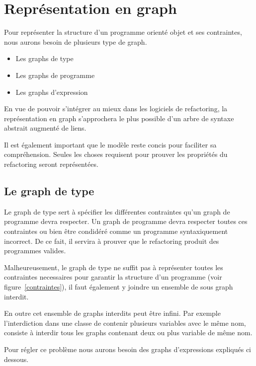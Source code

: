 \documentclass[a4paper, 12pt]{article}
\begin{document}
  \section{Représentation en graph}
  Pour représenter la structure d'un programme orienté objet et ses contraintes, nous aurons besoin de plusieurs type de graph.

  \begin{itemize}[label=\textbullet]
    \item Les graphs de type
    \item Les graphs de programme
    \item Les graphs d'expression
  \end{itemize}

  En vue de pouvoir s'intégrer au mieux dans les logiciels de refactoring, la représentation en graph s'approchera le plus possible d'un arbre de syntaxe abstrait augmenté de liens.

  Il est également important que le modèle reste concis pour faciliter sa compréhension. Seules les choses requisent pour prouver les propriétés du refactoring seront représentées.

  \subsection{Le graph de type}

  Le graph de type sert à spécifier les différentes contraintes qu'un graph de programme devra respecter.
  Un graph de programme devra respecter toutes ces contraintes ou bien être condidéré comme un programme syntaxiquement incorrect.
  De ce fait, il servira à prouver que le refactoring produit des programmes valides.

  Malheureusement, le graph de type ne suffit pas à représenter toutes les contraintes necessaires pour garantir la structure d'un programme (voir figure~\ref{contraintes}),
  il faut également y joindre un ensemble de sous graph interdit.

  En outre cet ensemble de graphs interdits peut être infini. Par exemple l'interdiction dans une classe de contenir plusieurs variables avec le même nom,
  consiste à interdir tous les graphs contenant deux ou plus variable de même nom.

  Pour régler ce problème nous aurons besoin des graphs d'expressions expliqués ci dessous.\label{subsec:graphExpression}
\end{document}
